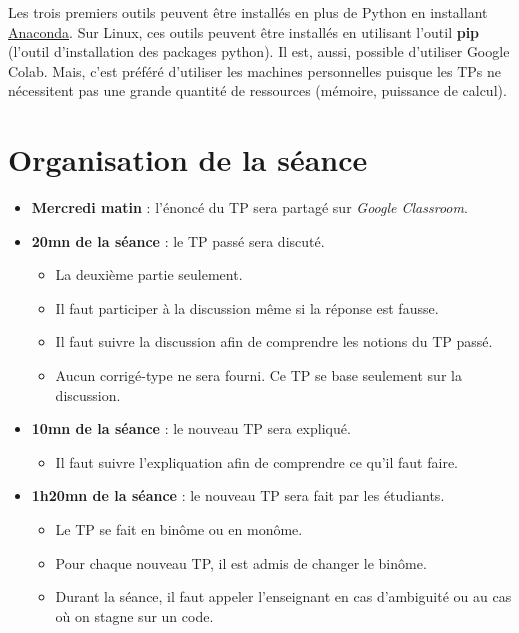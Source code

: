 \documentclass[11pt, a4paper]{article}
\begin{document}
Les trois premiers outils peuvent être installés en plus de Python en installant \href{https://www.anaconda.com/products/individual#Downloads}{Anaconda}.
Sur Linux, ces outils peuvent être installés en utilisant l'outil \textbf{pip} (l'outil d'installation des packages python).
Il est, aussi, possible d'utiliser Google Colab. 
Mais, c'est préféré d'utiliser les machines personnelles puisque les TPs ne nécessitent pas une grande quantité de ressources (mémoire, puissance de calcul). 


\section{Organisation de la séance}

\begin{itemize}
	\item \textbf{Mercredi matin} : l'énoncé du TP sera partagé sur \textit{Google Classroom}.
	
	\item \textbf{20mn de la séance} : le TP passé sera discuté.
	\begin{itemize}
		\item La deuxième partie seulement.
		\item Il faut participer à la discussion même si la réponse est fausse.
		\item Il faut suivre la discussion afin de comprendre les notions du TP passé.
		\item Aucun corrigé-type ne sera fourni. Ce TP se base seulement sur la discussion.
	\end{itemize}

	\item \textbf{10mn de la séance} : le nouveau TP sera expliqué.
	\begin{itemize}
		\item Il faut suivre l'expliquation afin de comprendre ce qu'il faut faire.
	\end{itemize}
	
	\item \textbf{1h20mn de la séance} : le nouveau TP sera fait par les étudiants.
	\begin{itemize}
		\item Le TP se fait en binôme ou en monôme.
		\item Pour chaque nouveau TP, il est admis de changer le binôme.
		\item Durant la séance, il faut appeler l'enseignant en cas d'ambiguité ou au cas où on stagne sur un code.
	\end{itemize}


\end{itemize}
\end{document}
